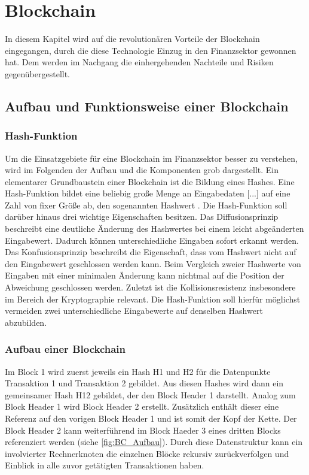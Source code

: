 \section{Blockchain}
In diesem Kapitel wird auf die revolutionären Vorteile der Blockchain 
eingegangen, durch die diese Technologie Einzug in den Finanzsektor gewonnen 
hat. Dem werden im Nachgang die einhergehenden Nachteile und Risiken gegenübergestellt. 

\subsection{Aufbau und Funktionsweise einer Blockchain}
\subsubsection{Hash-Funktion}
Um die Einsatzgebiete für eine Blockchain im Finanzsektor besser zu verstehen,
wird im Folgenden der Aufbau und die Komponenten grob dargestellt.
Ein elementarer Grundbaustein einer Blockchain ist die Bildung eines Hashes.
\glqq Eine Hash-Funktion bildet eine beliebig große Menge an Eingabedaten [...] auf eine Zahl von 
fixer Größe ab, den sogenannten Hashwert\grqq{} \cite[p.~6]{fill2020blockchain}.
Die Hash-Funktion soll darüber hinaus drei wichtige Eigenschaften besitzen.
Das Diffusionsprinzip beschreibt eine deutliche Änderung des Hashwertes bei einem leicht
abgeänderten Eingabewert. Dadurch können unterschiedliche Eingaben sofort erkannt werden.
Das Konfusionsprinzip beschreibt die Eigenschaft, dass vom Hashwert nicht auf den Eingabewert
geschlossen werden kann. Beim Vergleich zweier Hashwerte von Eingaben mit einer minimalen
Änderung kann nichtmal auf die Position der Abweichung geschlossen werden.
Zuletzt ist die Kollisionsresistenz insbesondere im Bereich der Kryptographie relevant.
Die Hash-Funktion soll hierfür möglichst vermeiden zwei unterschiedliche Eingabewerte
auf denselben Hashwert abzubilden.
\cite[p.~6ff]{fill2020blockchain} 

\subsubsection{Aufbau einer Blockchain}
Im Block 1 wird zuerst jeweils ein Hash H1 und H2 für die Datenpunkte Transaktion 1 
und Transaktion 2 gebildet. Aus diesen Hashes wird dann ein gemeinsamer Hash H12 gebildet, 
der den Block Header 1 darstellt.
Analog zum Block Header 1 wird Block Header 2 erstellt. Zusätzlich enthält dieser eine
Referenz auf den vorigen Block Header 1 und ist somit der Kopf der Kette. Der Block Header 2
kann weiterführend im Block Haeder 3 eines dritten Blocks referenziert werden 
(siehe \autoref{fig:BC_Aufbau}). 
Durch diese Datenstruktur kann ein involvierter Rechnerknoten die einzelnen Blöcke rekursiv
zurückverfolgen und Einblick in alle zuvor getätigten Transaktionen haben.
\cite[p.~17f]{fill2020blockchain}


